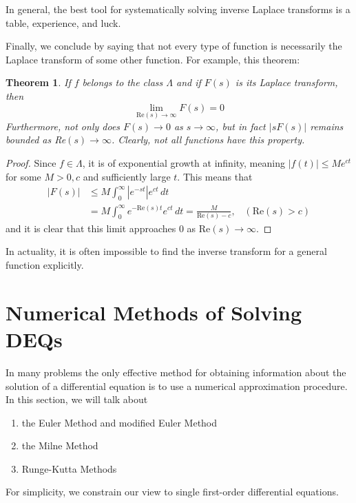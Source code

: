 \documentclass{article}
\newtheorem{theorem}{Theorem}[section]
\theoremstyle{remark}
\theoremstyle{definition}
\begin{document}
In general, the best tool for systematically solving inverse Laplace transforms is a table, experience, and luck. 

Finally, we conclude by saying that not every type of function is necessarily the Laplace transform of some other function. For example, this theorem: 

\begin{theorem}
If $f$ belongs to the class $\Lambda$ and if $F(s)$ is its Laplace transform, then 
\[\lim_{\text{Re}(s) \rightarrow\infty} F(s) = 0\]
Furthermore, not only does $F(s) \rightarrow 0$ as $s \rightarrow \infty$, but in fact $|s F(s)|$ remains bounded as Re$(s) \rightarrow \infty$. Clearly, not all functions have this property. 
\end{theorem}
\begin{proof}
Since $f \in \Lambda$, it is of exponential growth at infinity, meaning $|f(t)| \leq Me^{ct}$ for some $M>0, c$ and sufficiently large $t$. This means that
\begin{align*}
    |F(s)| & \leq M \int_0^\infty |e^{-st}| e^{ct} \, dt \\
    & = M \int_0^\infty e^{-\text{Re}(s) t} e^{ct}\,dt = \frac{M}{\text{Re}(s) - c}, \;\;\; (\text{Re}(s) > c)
\end{align*}
and it is clear that this limit approaches $0$ as Re$(s) \rightarrow \infty$. 
\end{proof}

In actuality, it is often impossible to find the inverse transform for a general function explicitly. 

\section{Numerical Methods of Solving DEQs}
In many problems the only effective method for obtaining information about the solution of a differential equation is to use a numerical approximation procedure. In this section, we will talk about
\begin{enumerate}
    \item the Euler Method and modified Euler Method
    \item the Milne Method
    \item Runge-Kutta Methods
\end{enumerate}
For simplicity, we constrain our view to single first-order differential equations. 
\end{document}
